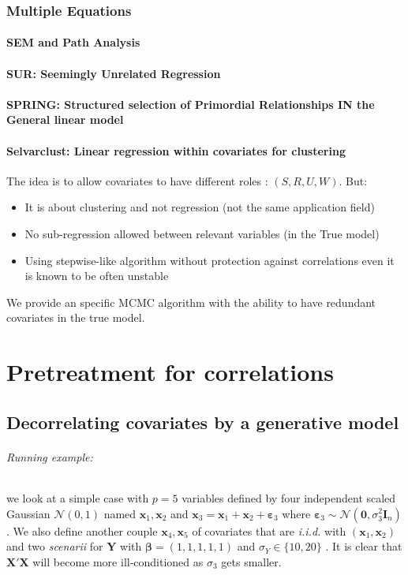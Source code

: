 \documentclass[11pt,a4paper]{report}
\begin{document}
	\section{Multiple Equations}
		\subsection{SEM and Path Analysis}
		\subsection{SUR: Seemingly Unrelated Regression}
			\cite{SURzellner}
		\subsection{SPRING: Structured selection of Primordial Relationships IN the General linear model}
			\cite{chiquetconf}			
			
		\subsection{Selvarclust: Linear regression within covariates for clustering}
			\cite{maugis2009variable}
			The idea is to allow covariates to have different roles : $(S,R,U,W)$.
			But:
			\begin{itemize}
				\item It is about clustering and not regression (not the same application field)
				\item No sub-regression allowed between relevant variables (in the True model)
				\item Using stepwise-like algorithm without protection against correlations \cite{raftery2006variable} even it is known to be often unstable \cite{miller2002subset}
			\end{itemize}	
			We provide an specific MCMC algorithm with the ability to have redundant covariates in the true model.		 
\part{Pretreatment for correlations}
\chapter{Decorrelating covariates by a generative model}

\paragraph{Running example:} we look at a simple case with $p=5$ variables defined by four independent scaled Gaussian $\mathcal{N}(0,1)$ named $\boldsymbol{x}_1,\boldsymbol{x}_2$ and $\boldsymbol{x}_3=\boldsymbol{x}_1+\boldsymbol{x}_2+\boldsymbol{\varepsilon}_3$ where $\boldsymbol{\varepsilon}_3\sim{\mathcal{N}(\boldsymbol{0},\sigma_3^2\boldsymbol{I}_n)}$. We also define another couple $\boldsymbol{x}_4,\boldsymbol{x}_5$ of covariates that are {\it i.i.d. } with $(\boldsymbol{x}_1,\boldsymbol{x}_2)$ and two {\it scenarii} for $\boldsymbol{Y}$ with $\boldsymbol{\beta}=(1,1,1,1,1)$ and $\sigma_Y \in \{10,20\}$ .
It is clear that $\boldsymbol{X}'\boldsymbol{X}$ will become more ill-conditioned as $\sigma_3$ gets smaller.
	
\end{document}
